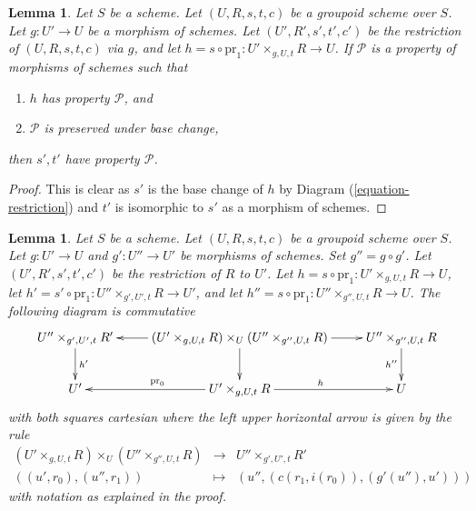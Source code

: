 \documentclass{stacks-project}
\theoremstyle{plain}
\newtheorem{lemma}[subsection]{Lemma}
\theoremstyle{definition}
\theoremstyle{remark}
\numberwithin{equation}{subsection}
\begin{document}
\begin{lemma}
\label{lemma-restrict-property}
Let $S$ be a scheme.
Let $(U, R, s, t, c)$ be a groupoid scheme over $S$.
Let $g : U' \to U$ be a morphism of schemes.
Let $(U', R', s', t', c')$ be the restriction of
$(U, R, s, t, c)$ via $g$, and let
$h = s \circ \text{pr}_1 : U' \times_{g, U, t} R \to U$. If
$\mathcal{P}$ is a property of morphisms of schemes such that
\begin{enumerate}
\item $h$ has property $\mathcal{P}$, and
\item $\mathcal{P}$ is preserved under base change,
\end{enumerate}
then $s', t'$ have property $\mathcal{P}$.
\end{lemma}

\begin{proof}
This is clear as $s'$ is the base change of $h$ by
Diagram (\ref{equation-restriction})
and $t'$ is isomorphic to $s'$ as a morphism of schemes.
\end{proof}

\begin{lemma}
\label{lemma-double-restrict}
Let $S$ be a scheme.
Let $(U, R, s, t, c)$ be a groupoid scheme over $S$.
Let $g : U' \to U$ and $g' : U'' \to U'$ be morphisms of schemes.
Set $g'' = g \circ g'$.
Let $(U', R', s', t', c')$ be the restriction of $R$ to $U'$.
Let $h = s \circ \text{pr}_1 : U' \times_{g, U, t} R \to U$,
let $h' = s' \circ \text{pr}_1 : U'' \times_{g', U', t} R \to U'$, and
let $h'' = s \circ \text{pr}_1 : U'' \times_{g'', U, t} R \to U$.
The following diagram is commutative
$$
\xymatrix{
U'' \times_{g', U', t} R' \ar[d]^{h'} &
(U' \times_{g, U, t} R) \times_U (U'' \times_{g'', U, t} R)
\ar[l] \ar[r] \ar[d] &
U'' \times_{g'', U, t} R \ar[d]_{h''} \\
U' &
U' \times_{g, U, t} R \ar[l]_{\text{pr}_0} \ar[r]^h &
U
}
$$
with both squares cartesian where the left upper horizontal arrow
is given by the rule
$$
\begin{matrix}
(U' \times_{g, U, t} R) \times_U (U'' \times_{g'', U, t} R) &
\longrightarrow &
U'' \times_{g', U', t} R' \\
((u', r_0), (u'', r_1)) &
\longmapsto &
(u'', (c(r_1, i(r_0)), (g'(u''), u')))
\end{matrix}
$$
with notation as explained in the proof.
\end{lemma}
\end{document}
